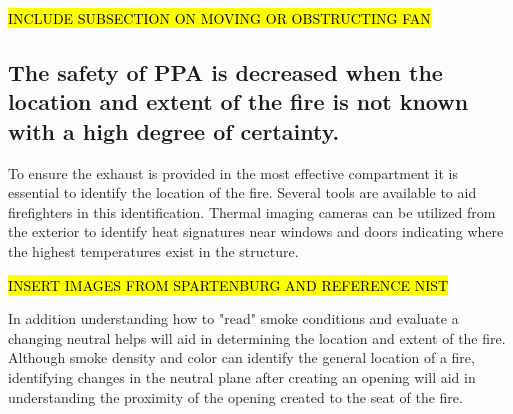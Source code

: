 \documentclass{article}
\begin{document}
\hl{INCLUDE SUBSECTION ON MOVING OR OBSTRUCTING FAN}

\subsection{The safety of PPA is decreased when the location and extent of the fire is not known with a high degree of certainty.}
To ensure the exhaust is provided in the most effective compartment it is essential to identify the location of the fire. Several tools are available to aid firefighters in this identification. Thermal imaging cameras can be utilized from the exterior to identify heat signatures near windows and doors indicating where the highest temperatures exist in the structure. 

\hl{INSERT IMAGES FROM SPARTENBURG AND REFERENCE NIST}

In addition understanding how to "read" smoke conditions and evaluate a changing neutral helps will aid in determining the location and extent of the fire. Although smoke density and color can identify the general location of a fire, identifying changes in the neutral plane after creating an opening will aid in understanding the proximity of the opening created to the seat of the fire. 
\end{document}

